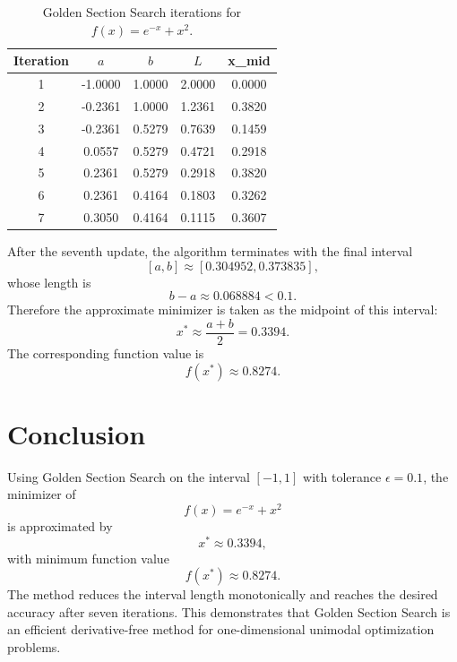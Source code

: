 \documentclass{article}
\begin{document}
\begin{table}[H]
    \centering
    \begin{tabular}{ccccc}
        \toprule
        Iteration & $a$     & $b$    & $L$    & x\_mid \\
        \midrule
        1         & -1.0000 & 1.0000 & 2.0000 & 0.0000 \\
        2         & -0.2361 & 1.0000 & 1.2361 & 0.3820 \\
        3         & -0.2361 & 0.5279 & 0.7639 & 0.1459 \\
        4         & 0.0557  & 0.5279 & 0.4721 & 0.2918 \\
        5         & 0.2361  & 0.5279 & 0.2918 & 0.3820 \\
        6         & 0.2361  & 0.4164 & 0.1803 & 0.3262 \\
        7         & 0.3050  & 0.4164 & 0.1115 & 0.3607 \\
        \bottomrule
    \end{tabular}
    \caption{Golden Section Search iterations for $f(x)=e^{-x}+x^2$.}
    \label{tab:golden}
\end{table}

After the seventh update, the algorithm terminates with the final interval
\[
    [a,b] \approx [0.304952, 0.373835],
\]
whose length is
\[
    b-a \approx 0.068884 < 0.1.
\]
Therefore the approximate minimizer is taken as the midpoint of this interval:
\[
    x^* \approx \frac{a+b}{2} = 0.3394.
\]
The corresponding function value is
\[
    f(x^*) \approx 0.8274.
\]

\section{Conclusion}

Using Golden Section Search on the interval $[-1,1]$ with tolerance $\epsilon = 0.1$, the minimizer of
\[
    f(x) = e^{-x} + x^2
\]
is approximated by
\[
    x^* \approx 0.3394,
\]
with minimum function value
\[
    f(x^*) \approx 0.8274.
\]
The method reduces the interval length monotonically and reaches the desired accuracy after seven iterations. This demonstrates that Golden Section Search is an efficient derivative-free method for one-dimensional unimodal optimization problems.
\end{document}
